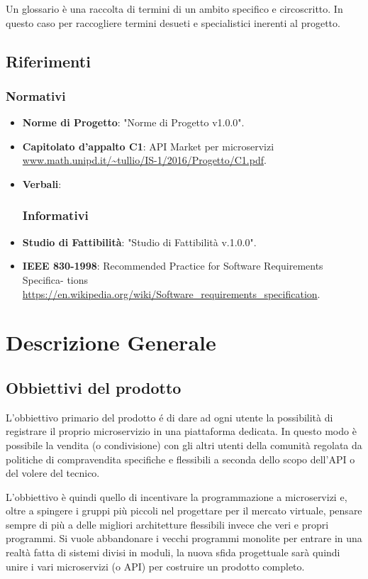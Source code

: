 \documentclass[12pt,a4paper,titlepage]{article}
\begin{document}
	Un glossario è una raccolta di termini di un ambito specifico e circoscritto. In questo caso per raccogliere termini desueti e specialistici inerenti al progetto. 
	\subsection{Riferimenti}
	\subsubsection{Normativi}
	\begin{itemize}
		\item \textbf{Norme di Progetto}:	"Norme di Progetto v1.0.0".
		\item \textbf{Capitolato d'appalto C1}:	API Market per microservizi \\
		\textcolor{blue}{\url{www.math.unipd.it/~tullio/IS-1/2016/Progetto/C1.pdf}}. 
		\item \textbf{Verbali}:
		\subsubsection{Informativi}
		\item \textbf {Studio di Fattibilità}: "Studio di Fattibilità v.1.0.0".
		\item \textbf{IEEE 830-1998}: Recommended Practice for Software Requirements Specifica- tions \\
		\textcolor{blue}{\url{https://en.wikipedia.org/wiki/Software_requirements_specification}}.
	\end{itemize}
	
	\newpage
	
	\section{Descrizione Generale}
	\subsection{Obbiettivi del prodotto}
	L'obbiettivo primario del prodotto é di dare ad ogni utente la possibilità di registrare il proprio microservizio in una piattaforma dedicata. In questo modo è possibile la vendita (o condivisione) con gli altri utenti della comunità regolata da politiche di compravendita specifiche e flessibili a seconda dello scopo dell'API o del volere del tecnico. 
	
	L'obbiettivo è quindi quello di incentivare la programmazione a microservizi e, oltre a spingere i gruppi più piccoli nel progettare per il mercato virtuale, pensare sempre di più a delle migliori architetture flessibili invece che veri e propri programmi. Si vuole abbandonare i vecchi programmi monolite per entrare in una realtà fatta di sistemi divisi in moduli, la nuova sfida progettuale sarà quindi unire i vari microservizi (o API) per costruire un prodotto completo.
\end{document}
